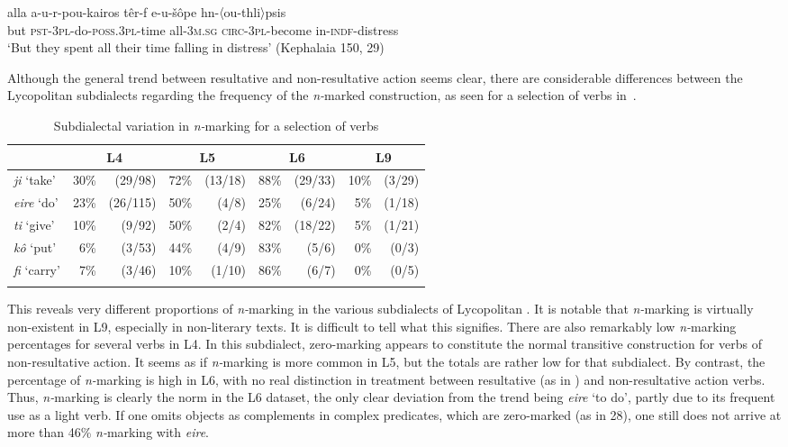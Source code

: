 \documentclass[output=paper]{LSP/langsci}
\begin{document}
\begin{exe}
\ex \label{06-en:ex:30}
\gll alla 	a-u-r-pou-kairos 		têr-f 		e-u-šôpe 		hn-〈ou-thli〉psis\\
	but \textsc{pst-}3\textsc{pl-}do-\textsc{poss.3pl-}time all-\textsc{3m.sg} \textsc{circ-3pl-}become in-\textsc{indf-}distress\\
\glt ‘But they spent all their time falling in distress’ (Kephalaia 150, 29)
\end{exe}

Although the general trend between resultative and non-resultative action seems clear, there are considerable differences between the Lycopolitan subdialects regarding the frequency of the \textit{n-}marked construction, as seen for a selection of verbs in~.

\begin{table}
\begin{tabular}{l r@{\,}r r@{\,}r r@{\,}r r@{\,}r}
\lsptoprule  
		  & 
\multicolumn{2}{c}{L4} &
\multicolumn{2}{c}{L5} &
\multicolumn{2}{c}{L6} &
\multicolumn{2}{c}{L9}\\
\midrule
\textit{ji} ‘take’ & 30\%& (29/98) & 72\%& (13/18) & 88\%& (29/33) & 10\%& (3/29)\\
\textit{eire} ‘do’ & 23\%& (26/115) & 50\%& (4/8) & 25\%& (6/24) & 5\%& (1/18)\\
\textit{ti} ‘give’ & 10\%& (9/92) & 50\%& (2/4) & 82\%& (18/22) & 5\%& (1/21)\\
\textit{kô} ‘put’ & 6\%& (3/53) & 44\%& (4/9) & 83\%& (5/6) & 0\%& (0/3)\\
\textit{fi} ‘carry’ & 7\%& (3/46) & 10\%& (1/10) & 86\%& (6/7) & 0\%& (0/5)\\
\lspbottomrule
\end{tabular}
\caption{Subdialectal variation in \textit{n-}marking for a selection of verbs}\label{06-en-tab:6}
\end{table}

This reveals very different proportions of \textit{n-}marking in the various subdialects of Lycopolitan . It is notable that \textit{n-}marking is virtually non-existent in L9, especially in non-literary texts. It is difficult to tell what this signifies. There are also remarkably low \textit{n-}marking percentages for several verbs in L4. In this subdialect, zero-marking appears to constitute the normal transitive construction for verbs of non-resultative action. It seems as if \textit{n-}marking is more common in L5, but the totals are rather low for that subdialect. By contrast, the percentage of \textit{n-}marking is high in L6, with no real distinction in treatment between resultative (as in ) and non-resultative action verbs. Thus, \textit{n-}marking is clearly the norm in the L6 dataset, the only clear deviation from the trend being \textit{eire} ‘to do’, partly due to its frequent use as a light verb. If one omits objects as complements in complex predicates, which are zero-marked (as in 28), one still does not arrive at more than 46\% \textit{n-}marking with \textit{eire}. 
\end{document}
